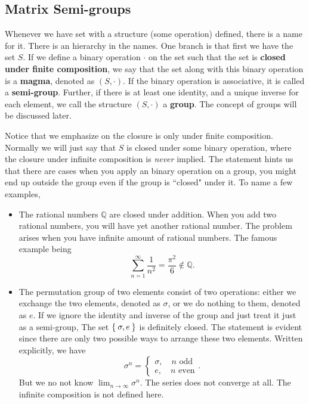 \documentclass[10pt,a4paper]{article}
\begin{document}
	\subsection{Matrix Semi-groups}
	Whenever we have set with a structure (some operation) defined, there is a name for it. There is an hierarchy in the names. One branch is that first we have the set $S$. If we define a binary operation $\cdot$ on the set such that the set is \textbf{closed under finite composition}, we say that the set along with this binary operation is a \textbf{magma}, denoted as $(S, \cdot)$. If the binary operation is associative, it is called a \textbf{semi-group}. Further, if there is at least one identity, and a unique inverse for each element, we call the structure $(S, \cdot)$ a \textbf{group}. The concept of groups will be discussed later.
	
	Notice that we emphasize on the closure is only under finite composition. Normally we will just say that $S$ is closed under some binary operation, where the closure under infinite composition is \textit{never} implied. The statement hints us  that there are cases when you apply an binary operation on a group, you might end up outside the group even if the group is ``closed" under it. To name a few examples, 
	\begin{itemize}
		\item The rational numbers $\mathbb Q$ are closed under addition. When you add two rational numbers, you will have yet another rational number. The problem arises when you have infinite amount of rational numbers. The famous example being 
		\begin{equation*}
		\sum_{n=1}^\infty \frac{1}{n^2} = \frac{\pi^2}{6} \notin \mathbb Q.
		\end{equation*} 
		\item The permutation group of two elements consist of two operations: either we exchange the two elements, denoted as $\sigma$, or we do nothing to them, denoted as $e$. If we ignore the identity and inverse of the group and just treat it just as a semi-group, The set $\Set{\sigma,e}$ is definitely closed. The statement is evident since there are only two possible ways to arrange these two elements. Written explicitly, we have
		\begin{equation*}
		\sigma^n=\begin{cases}
		\sigma, \quad n \text{ odd}\\
		e,\quad n \text{ even}
		\end{cases}.
		\end{equation*}
		But we no not know $\lim_{n\rightarrow \infty} \sigma^n$. The series does not converge at all. The infinite composition is not defined here.
	\end{itemize}
\end{document}
